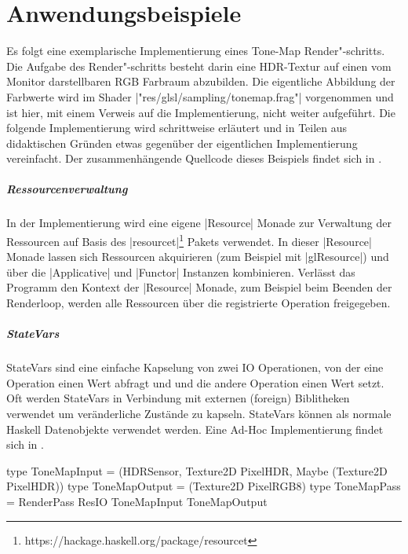 \chapter{Anwendungsbeispiele}
\label{chap:anwendung}

Es folgt eine exemplarische Implementierung eines Tone-Map Render"-schritts. Die Aufgabe des Render"-schritts besteht darin eine HDR-Textur auf einen vom Monitor darstellbaren RGB Farbraum abzubilden. Die eigentliche Abbildung der Farbwerte wird im Shader |"res/glsl/sampling/tonemap.frag"| vorgenommen und ist hier, mit einem Verweis auf die Implementierung, nicht weiter aufgeführt. Die folgende Implementierung wird schrittweise erläutert und in Teilen aus didaktischen Gründen etwas gegenüber der eigentlichen Implementierung vereinfacht. Der zusammenhängende Quellcode dieses Beispiels findet sich in .

\paragraph{Ressourcenverwaltung} In der Implementierung wird eine eigene |Resource| Monade zur Verwaltung der Ressourcen auf Basis des |resourcet|\footnote{https://hackage.haskell.org/package/resourcet} Pakets verwendet. In dieser |Resource| Monade lassen sich Ressourcen akquirieren (zum Beispiel mit |glResource|) und über die |Applicative| und |Functor| Instanzen kombinieren. Verlässt das Programm den Kontext der |Resource| Monade, zum Beispiel beim Beenden der Renderloop, werden alle Ressourcen über die registrierte Operation freigegeben.

\paragraph{StateVars} StateVars sind eine einfache Kapselung von zwei IO Operationen, von der eine Operation einen Wert abfragt und und die andere Operation einen Wert setzt. Oft werden StateVars in Verbindung mit externen (foreign) Biblitheken verwendet um veränderliche Zustände zu kapseln. StateVars können als normale Haskell Datenobjekte verwendet werden. Eine Ad-Hoc Implementierung findet sich in .

\begin{haskell}[label={lst:tonemap-pass-sig},caption={\texttt{ToneMapPass} Signatur}]
type ToneMapInput = (HDRSensor, Texture2D PixelHDR, Maybe (Texture2D PixelHDR))
type ToneMapOutput = (Texture2D PixelRGB8)
type ToneMapPass = RenderPass ResIO ToneMapInput ToneMapOutput
\end{haskell}

